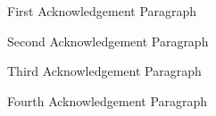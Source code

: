 \begin{large}
\begin{flushleft}
\noindent First Acknowledgement Paragraph \\
\end{flushleft}

\begin{flushleft}
\noindent Second Acknowledgement Paragraph\\
\end{flushleft}

\begin{flushleft}
\noindent Third Acknowledgement Paragraph\\
\end{flushleft}

\begin{flushleft}
\noindent Fourth Acknowledgement Paragraph\\
\end{flushleft}

\end{large}